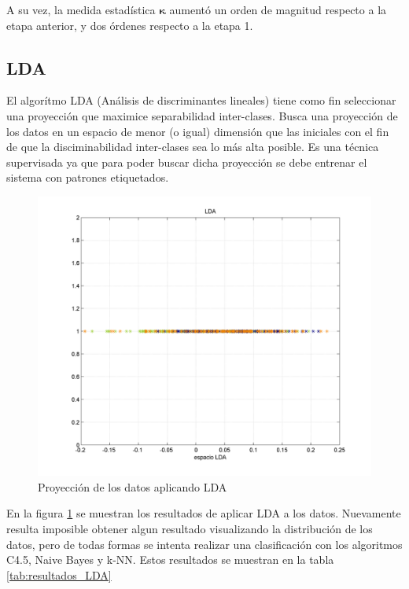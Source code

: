 \documentclass[12pt,a4paper,titlepage]{report}
\newcommand{\bs}{\boldsymbol}
\begin{document}
A su vez, la medida estadística $\bs\kappa$ aumentó un orden de magnitud respecto a la etapa anterior, y dos órdenes respecto a la etapa 1.

\subsection{LDA}
El algorítmo LDA (Análisis de discriminantes lineales) tiene como fin seleccionar una proyección que maximice separabilidad inter-clases. Busca una proyección de los datos en un espacio de menor (o igual) dimensión que las iniciales con el fin de que la disciminabilidad inter-clases sea lo más alta posible. Es una técnica supervisada ya que para poder buscar dicha proyección se debe entrenar el sistema con patrones etiquetados.\\

\begin{figure}
	\centering 
	\includegraphics[width=.8\textwidth]{pics/lda2}
	\caption{Proyección de los datos aplicando LDA}
	\label{fig:lda}
\end{figure}

En la figura \ref{fig:lda} se muestran los resultados de aplicar LDA a los datos. Nuevamente resulta imposible obtener algun resultado visualizando la distribución de los datos, pero de todas formas se intenta realizar una clasificación con los algoritmos C4.5, Naive Bayes y k-NN. Estos resultados se muestran en la tabla \ref{tab:resultados_LDA}
\end{document}
